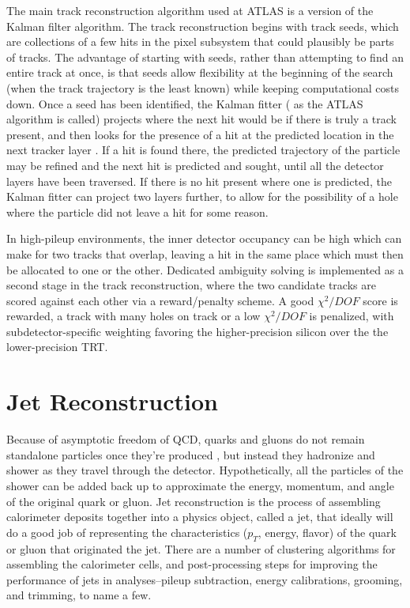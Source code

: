 The main track reconstruction algorithm used at ATLAS is a version of the Kalman filter algorithm.  The track reconstruction 
begins with track seeds, which are collections of a few hits in the pixel subsystem that could plausibly be 
parts of tracks.  The advantage of starting with seeds, rather than attempting to find an entire track at 
once, is that seeds allow flexibility at the beginning of the search (when the track trajectory is the 
least known) while keeping computational costs down.  Once a seed has been identified, the Kalman fitter (
as the ATLAS algorithm is called) projects where the next hit would be if there is truly a track 
present, and then looks for the presence of a hit at the predicted location in the next tracker layer
.  If a hit is found there, the predicted trajectory of the particle may be refined and the next 
hit is predicted and sought, until all the detector layers have been traversed. If there is no hit 
present where one is predicted, the Kalman fitter can project two layers further, to allow for the possibility 
of a hole where the particle did not leave a hit for some reason. 

In high-pileup environments, the inner detector occupancy can be high which can make for two tracks that 
overlap, leaving a hit in the same place which must then be allocated to one or the other.  
Dedicated ambiguity solving is implemented as a second stage in the track reconstruction, where the two candidate tracks are 
scored against each other via a reward/penalty scheme.  A good $\chi^2/DOF$ 
score is rewarded, a track with many holes on track or a low $\chi^2/DOF$ 
is penalized, with subdetector-specific weighting favoring the higher-precision silicon over the the lower-precision TRT. 



\section{Jet Reconstruction}
\label{sec:jet_reco}
Because of asymptotic freedom of QCD, quarks and gluons do not remain standalone particles once they're produced
, but instead they hadronize and shower as they travel through the detector.  Hypothetically, all the particles of 
the shower can be added back up to approximate the energy, momentum, and angle of the original quark 
or gluon.  Jet reconstruction is the process of assembling calorimeter deposits together into a physics object, called a 
jet, that ideally will do a good job of representing the characteristics ($p_T$, energy, 
flavor) of the quark or gluon that originated the jet.  There are a number of clustering algorithms for 
assembling the calorimeter cells, and post-processing steps for improving the performance of jets in analyses--pileup 
subtraction, energy calibrations, grooming, and trimming, to name a few.  


